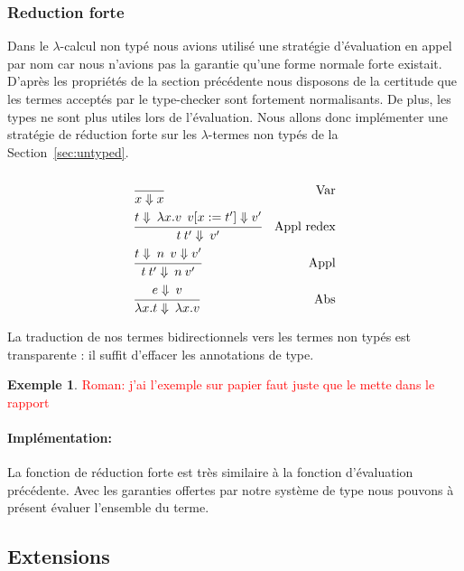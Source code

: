 \documentclass {article}
\newcommand{\codefrom}[3]
           {}
\theoremstyle{definition}
\newtheorem{example}{Exemple}
\theoremstyle{remark}
\newcommand{\todo}[1]{\textcolor{red}{#1}}
\begin{document}
\subsubsection{Reduction forte}

\label{reduction_forte}
Dans le \(\lambda\)-calcul non typé nous avions utilisé une stratégie d'évaluation en appel par nom
car nous n'avions pas la garantie qu'une forme normale forte existait.
D'après les propriétés de la section précédente nous disposons de la certitude que les termes acceptés  par le type-checker sont fortement normalisants. De plus, les types ne sont plus utiles lors de l'évaluation. 
Nous allons donc implémenter une stratégie de réduction forte sur les \(\lambda\)-termes non typés de la Section~\ref{sec:untyped}.

\begin{align*}
  &\cfrac{}
  {x \Downarrow x}&\mbox{Var} \\
  &\cfrac{t \Downarrow \: \lambda x.v \:\: v[x := t']\Downarrow v'}
  {t\:t'\Downarrow \: v'}&\mbox{Appl redex} \\
  &\cfrac{t \Downarrow \: n \:\: v \Downarrow v'}
  {t\:t'\Downarrow \: n \: v'}&\mbox{Appl} \\
  &\cfrac{e \Downarrow \: v}
  {\lambda x.t \Downarrow \: \lambda x.v}&\mbox{Abs}
\end{align*}

La traduction de nos termes bidirectionnels vers les termes non typés
est transparente : il suffit d'effacer les annotations de type.

\begin{example}
  \todo{Roman: j'ai l'exemple sur papier faut juste que le mette dans le rapport}
\end{example}

\paragraph{Implémentation:}
\label{reduction_petits_pas}

\codefrom{untyped}{lambda}{reduction_forte}

La fonction de réduction forte est très similaire à la fonction d'évaluation précédente.
Avec les garanties offertes par notre système de type nous pouvons à présent évaluer l'ensemble du
terme. 



\subsection{Extensions} 
\end{document}

